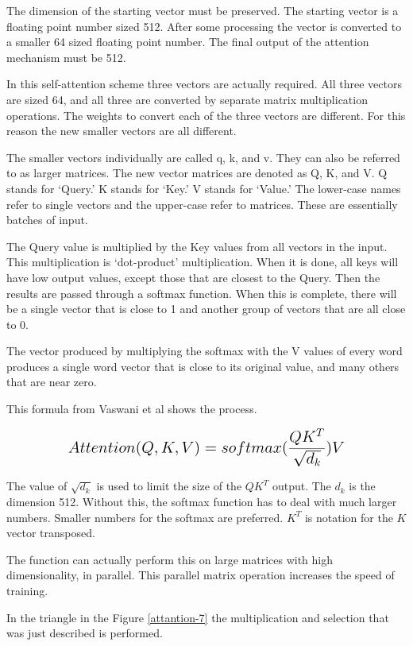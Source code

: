 The dimension of the starting vector must be preserved. The starting vector is a floating point number sized 512. After some processing the vector is converted to a smaller 64 sized floating point number. The final output of the attention mechanism must be 512. %

In this self-attention scheme three vectors are actually required. All three vectors are sized 64, and all three are converted by separate matrix multiplication operations. The weights to convert each of the three vectors are different. For this reason the new smaller vectors are all different.

The smaller vectors individually are called q, k, and v. They can also be referred to as larger matrices. The new vector matrices are denoted as Q, K, and V. Q stands for `Query.' K stands for `Key.' V stands for `Value.' The lower-case names refer to single vectors and the upper-case refer to matrices. These are essentially batches of input.

The Query value is multiplied by the Key values from all vectors in the input. This multiplication is `dot-product' multiplication. When it is done, all keys will have low output values, except those that are closest to the Query. Then the results are passed through a softmax function. When this is complete, there will be a single vector that is close to 1 and another group of vectors that are all close to 0.

The vector produced by multiplying the softmax with the V values of every word produces a single word vector that is close to its original value, and many others that are near zero.

This formula from Vaswani et al \cite{Vaswani2017AttentionIA} shows the process.

$$
\mathlarger{ \mathlarger{
Attention(Q,K,V)=softmax(\dfrac{QK^T}{\sqrt{d_k}})V
} }
$$

The value of $\sqrt{d_k}$ is used to limit the size of the $QK^T$ output. The $d_k$ is the dimension 512. Without this, the softmax function has to deal with much larger numbers. Smaller numbers for the softmax are preferred. $K^T$ is notation for the $K$ vector transposed.

The function can actually perform this on large matrices with high dimensionality, in parallel. This parallel matrix operation increases the speed of training.

In the triangle in the Figure \ref{attantion-7} the multiplication and selection that was just described is performed.

